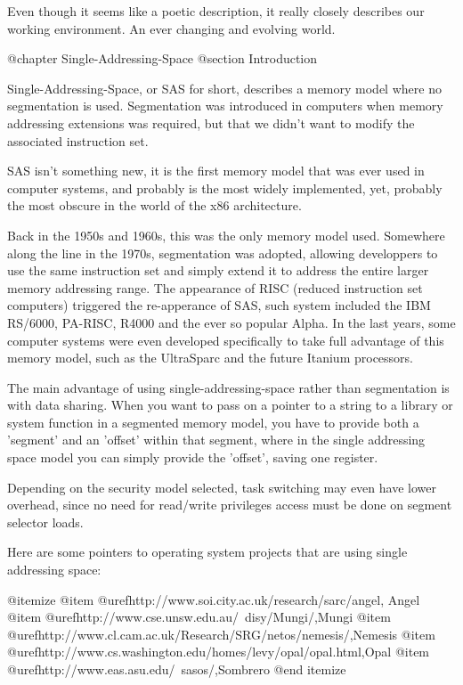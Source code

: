 Even though it seems like a poetic description, it really closely describes our
working environment.  An ever changing and evolving world.

@chapter Single-Addressing-Space
@section Introduction

Single-Addressing-Space, or SAS for short, describes a memory model where no
segmentation is used.  Segmentation was introduced in computers when memory
addressing extensions was required, but that we didn't want to modify the
associated instruction set.

SAS isn't something new, it is the first memory model that was ever used in
computer systems, and probably is the most widely implemented, yet, probably
the most obscure in the world of the x86 architecture.

Back in the 1950s and 1960s, this was the only memory model used.  Somewhere
along the line in the 1970s, segmentation was adopted, allowing developpers to
use the same instruction set and simply extend it to address the entire 
larger memory addressing range.  The appearance of RISC (reduced instruction
set computers) triggered the re-apperance of SAS, such system included the
IBM RS/6000, PA-RISC, R4000 and the ever so popular Alpha.  In the last years,
some computer systems were even developed specifically to take full advantage
of this memory model, such as the UltraSparc and the future Itanium processors.

The main advantage of using single-addressing-space rather than segmentation is
with data sharing.  When you want to pass on a pointer to a string to a library
or system function in a segmented memory model, you have to provide both a 
'segment' and an 'offset' within that segment, where in the single addressing
space model you can simply provide the 'offset', saving one register.

Depending on the security model selected, task switching may even have lower
overhead, since no need for read/write privileges access must be done on
segment selector loads.

Here are some pointers to operating system projects that are using single
addressing space:

@itemize
@item @uref{http://www.soi.city.ac.uk/research/sarc/angel, Angel}
@item @uref{http://www.cse.unsw.edu.au/~disy/Mungi/,Mungi}
@item @uref{http://www.cl.cam.ac.uk/Research/SRG/netos/nemesis/,Nemesis}
@item @uref{http://www.cs.washington.edu/homes/levy/opal/opal.html,Opal}
@item @uref{http://www.eas.asu.edu/~sasos/,Sombrero}
@end itemize

